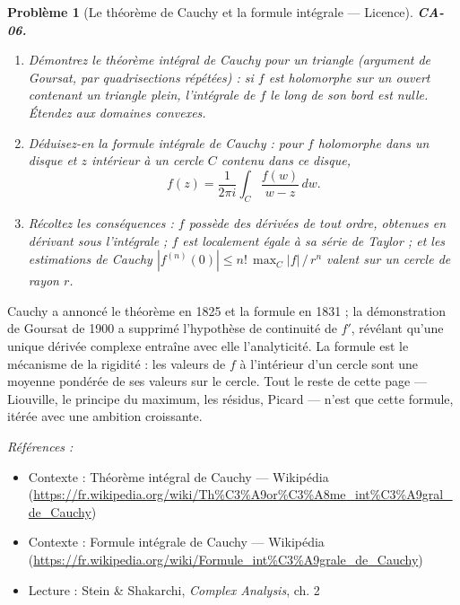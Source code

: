 \documentclass[11pt]{article}
\newtheorem{problem}{Problème}
\newenvironment{refs}{\par\small\noindent\emph{Références :}\begin{itemize}\setlength\itemsep{0pt}}{\end{itemize}\normalsize}
\begin{document}
\begin{problem}[{Le théorème de Cauchy et la formule intégrale --- Licence}]
\textbf{CA-06.} \begin{enumerate}
\item[(a)] Démontrez le théorème intégral de Cauchy pour un triangle
(argument de Goursat, par quadrisections répétées) : si $ f $ est holomorphe sur un ouvert
contenant un triangle plein, l'intégrale de $ f $ le long de son bord est nulle. Étendez aux
domaines convexes.
\item[(b)] Déduisez-en la formule intégrale de Cauchy : pour $ f $ holomorphe dans un disque et
$ z $ intérieur à un cercle $ C $ contenu dans ce disque,
\[ f(z) = \frac{1}{2\pi i} \int_C \frac{f(w)}{w - z}\,dw. \]
\item[(c)] Récoltez les conséquences : $ f $ possède des dérivées de tout ordre, obtenues en dérivant
sous l'intégrale ; $ f $ est localement égale à sa série de Taylor ; et les estimations de Cauchy
$ |f^{(n)}(0)| \le n! \, \max_C |f| \, / \, r^n $ valent sur un cercle de rayon $ r $.
\end{enumerate}

\end{problem}

\noindent Cauchy a annoncé le théorème en 1825 et la formule en 1831 ; la démonstration de
Goursat de 1900 a supprimé l'hypothèse de continuité de $ f' $, révélant qu'une unique dérivée
complexe entraîne avec elle l'analyticité. La formule est le mécanisme de la rigidité : les valeurs
de $ f $ à l'intérieur d'un cercle sont une moyenne pondérée de ses valeurs sur le cercle. Tout le
reste de cette page --- Liouville, le principe du maximum, les résidus, Picard --- n'est que cette
formule, itérée avec une ambition croissante.

\begin{refs}
\item Contexte : Théorème intégral de Cauchy --- Wikipédia (\url{https://fr.wikipedia.org/wiki/Th%C3%A9or%C3%A8me_int%C3%A9gral_de_Cauchy})
\item Contexte : Formule intégrale de Cauchy --- Wikipédia (\url{https://fr.wikipedia.org/wiki/Formule_int%C3%A9grale_de_Cauchy})
\item Lecture : Stein \& Shakarchi, \textit{Complex Analysis}, ch. 2
\end{refs}

\bigskip
\end{document}
